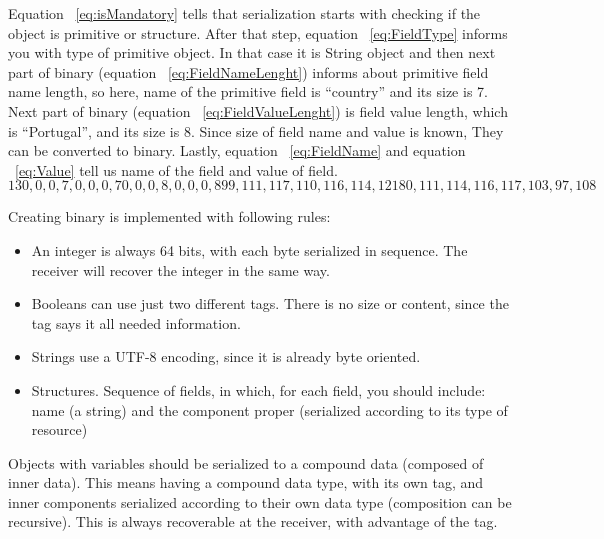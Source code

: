Equation ~\ref{eq:isMandatory} tells that serialization starts with checking if the object is primitive or structure. After that step, equation ~\ref{eq:FieldType} informs you with type of primitive object. In that case it is String object and then next part of binary (equation ~\ref{eq:FieldNameLenght}) informs about primitive field name length, so here, name of the primitive field is “country” and its size is 7. Next part of binary (equation ~\ref{eq:FieldValueLenght}) is field value length, which is “Portugal”, and its size is 8. Since size of field name and value is known, They can be converted to binary. Lastly, equation ~\ref{eq:FieldName} and equation ~\ref{eq:Value} tell us name of the field and value of field.
\begin{subequations}
    \begin{equation}
    1
    \label{eq:isMandatory}
    \end{equation}
    \begin{equation}
    3
    \label{eq:FieldType}
    \end{equation}
    \begin{equation}
    0, 0, 0, 7, 0, 0, 0, 7
    \label{eq:FieldNameLenght}
    \end{equation}
    \begin{equation}
    0, 0, 0, 8, 0, 0, 0, 8
    \label{eq:FieldValueLenght}
    \end{equation}
    \begin{equation}
    99, 111, 117, 110, 116, 114, 121
    \label{eq:FieldName}
    \end{equation}
    \begin{equation}
    80, 111, 114, 116, 117, 103, 97, 108
    \label{eq:Value}
    \end{equation}
\label{eq:NavierStokes}%
\end{subequations}

Creating binary is implemented with following rules:

\begin{itemize}
\item 	An integer is always 64 bits, with each byte serialized in sequence. The receiver will recover the integer in the same way.
\item 	Booleans can use just two different tags. There is no size or content, since the tag says it all needed information.
\item 	Strings use a UTF-8 encoding, since it is already byte oriented.
\item 	Structures. Sequence of fields, in which, for each field, you should include: name (a string) and the component proper (serialized according to its type of resource)
\end{itemize}

Objects with variables should be serialized to a compound data (composed of inner data). This means having a compound data type, with its own tag, and inner components serialized according to their own data type (composition can be recursive). This is always recoverable at the receiver, with advantage of the tag.

